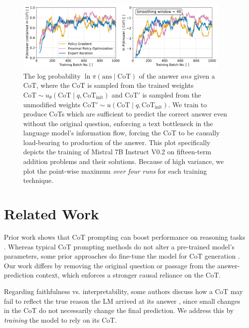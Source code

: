 \documentclass{article}
\theoremstyle{plain}
\theoremstyle{definition}
\theoremstyle{remark}
\begin{document}
\begin{figure}
    \centering
    \includegraphics[width=0.95\textwidth]{Figures/cot_performance_comparison.png}
    \caption{The log probability $\ln \pi(\text{ans} \mid \text{CoT})$ of the answer $ans$ given a $\text{CoT}$, where the $\text{CoT}$ is sampled from the trained weights $\text{CoT} \sim u_\theta(\text{CoT} \mid q, \text{CoT}_{\text{init}})$ and $\text{CoT}'$ is sampled from the unmodified weights $\text{CoT}' \sim u(\text{CoT} \mid q, \text{CoT}_{\text{init}})$. We train to produce CoTs which are sufficient to predict the correct answer even without the original question, enforcing a text bottleneck in the language model's information flow, forcing the CoT to be causally load-bearing to production of the answer. This plot specifically depicts the training of Mistral 7B Instruct V0.2 on fifteen-term addition problems and their solutions. Because of high variance, we plot the point-wise maximum \emph{over four runs} for each training technique.}
    \label{fig:loss}
\end{figure}

\section{Related Work}
\label{sec:related_work}

Prior work shows that CoT prompting can boost performance on reasoning tasks \citep{wei2022chain, nye2022show}.
Whereas typical CoT prompting methods do not alter a pre-trained model's parameters, some prior approaches do fine-tune the model for CoT generation \citep{nye2022show, eric_star2022, zelikman2024quietstar, deepseekai2025}. Our work differs by removing the original question or passage from the answer-prediction context, which enforces a stronger causal reliance on the CoT.

Regarding faithfulness vs. interpretability, some authors discuss how a CoT may fail to reflect the true reason the LM arrived at its answer \citep{lanham2023measuring, turpin2023language}, since small changes in the CoT do not necessarily change the final prediction. We address this by \emph{training} the model to rely on its CoT.
\end{document}
